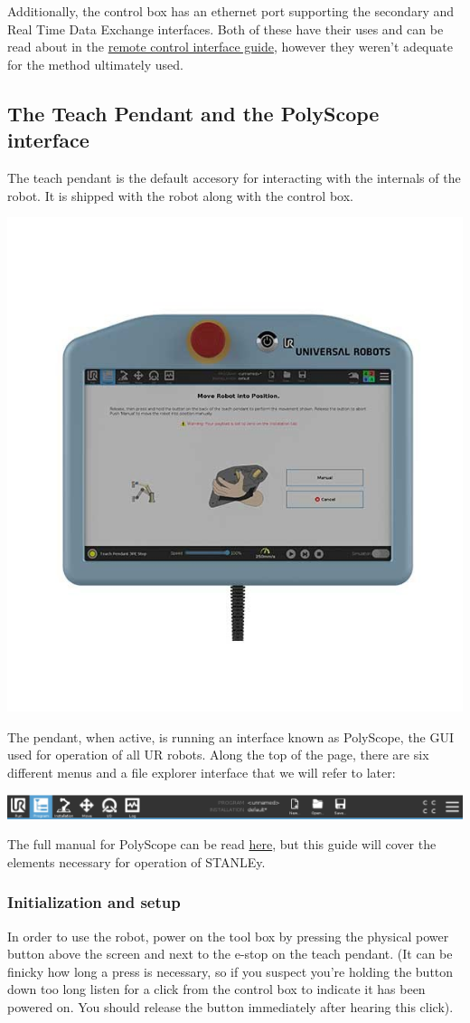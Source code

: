 \documentclass[11pt]{article}
\begin{document}
Additionally, the control box has an ethernet port supporting the secondary and Real Time Data Exchange interfaces. Both of these have their uses and can be read about in the \hyperlink{https://www.universal-robots.com/articles/ur/interface-communication/remote-control-via-tcpip/}{remote control interface guide}, however they weren't adequate for the method ultimately used.

\subsection{The Teach Pendant and the PolyScope interface}\label{sec:pendant}
The teach pendant is the default accesory for interacting with the internals of the robot. It is shipped with the robot along with the control box.
\begin{center}
\includegraphics[width=.5\linewidth]{figures/teach_pendant.jpg}
\end{center}
The pendant, when active, is running an interface known as PolyScope, the GUI used for operation of all UR robots. Along the top of the page, there are six different menus and a file explorer interface that we will refer to later:

\begin{center}
\includegraphics*[width=\linewidth]{figures/menu_banner.jpg}
\end{center}

The full manual for PolyScope can be read \hyperlink{https://s3-eu-west-1.amazonaws.com/ur-support-site/114079/99403_UR3e_User_Manual_en_Global.pdf\#page=107\&zoom=100,76,233}{here}, but this guide will cover the elements necessary for operation of STANLEy.

\subsubsection{Initialization and setup}\label{sec:powerup}
In order to use the robot, power on the tool box by pressing the physical power button above the screen and next to the e-stop on the teach pendant. 
(It can be finicky how long a press is necessary, so if you suspect you're holding the button down too long listen for a click from the control box to indicate it has been powered on. You should release the button immediately after hearing this click).
\end{document}
